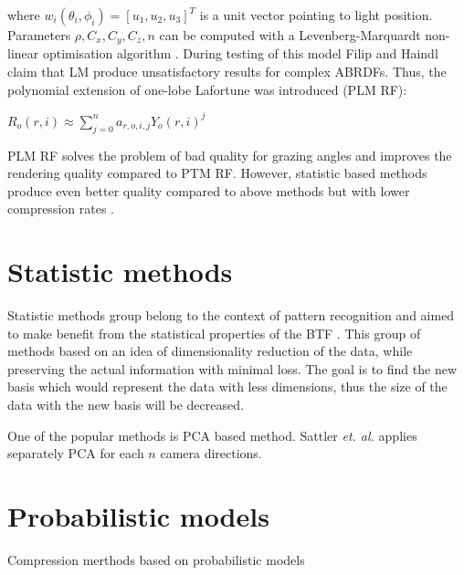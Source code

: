 where $w_{i}(\theta_{i}, \phi_{i})=[u_{1},u_{2},u_{3}]^{T}$ is a unit vector pointing to light position.
Parameters $\rho,C_{x},C_{y},C_{z},n$ can be computed with a Levenberg-Marquardt non-linear optimisation algorithm \cite{plm}. 
During testing of this model Filip and Haindl \cite{plm} claim that LM produce unsatisfactory results for complex ABRDFs.
 Thus, the polynomial extension of one-lobe Lafortune was introduced (PLM RF):

{\centering$R_{o}(r,i)\approx  \sum_{j=0}^{n} a_{r,o,i,j}Y_{o}(r,i)^j$\\}



PLM RF solves the problem of bad quality for grazing angles and improves the rendering quality compared to PTM RF.
However, statistic based methods produce even better quality compared to above methods but with lower compression rates \cite{haindl}.



  \section{Statistic methods}
\label{section:stat_methods}
 Statistic methods group belong to the context of pattern recognition and aimed to make benefit from the statistical properties of the BTF \cite{schneider2004}.
This group of methods based on an idea of dimensionality reduction of the data, while preserving the actual information with minimal loss.
The goal is to find the new basis which would represent the data with less dimensions, thus the size of the data with the new basis will be decreased.

One of the popular methods is PCA based method. Sattler  \emph{et. al.} \cite{sattler-2003-efficient} applies separately PCA for each $n$ camera directions.



 \section{Probabilistic models}
\label{section:prob_methods}

Compression merthods based on probabilistic models \cite{car_model,gmrf_model,haindl}